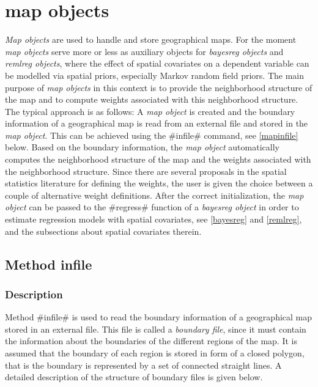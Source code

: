 \chapter{map objects}
\label{map} 

{\em Map objects} are used to handle and store geographical maps.
For the moment {\em map objects} serve more or less as auxiliary
objects for {\em bayesreg objects} and {\em remlreg objects}, where
the effect of spatial covariates on a dependent variable can be
modelled via spatial priors, especially Markov random field priors.
The main purpose of {\em map objects} in this context is to provide
the neighborhood structure of the map and to compute weights
associated with this neighborhood structure. The typical approach is
as follows: A {\em map object} is created and the boundary
information of a geographical map is read from an external file and
stored in the {\em map object}. This can be achieved using the
#infile# command, see \autoref{mapinfile} below. Based on the
boundary information, the {\em map object} automatically computes
the neighborhood structure of the map and the weights associated
with the neighborhood structure. Since there are several proposals
in the spatial statistics literature for defining the weights, the
user is given the choice between a couple of alternative weight
definitions. After the correct initialization, the {\em map object}
can be passed to the #regress# function of a {\em bayesreg object}
in order to estimate regression models with spatial covariates, see
\autoref{bayesreg} and \autoref{remlreg}, and the subsections about
spatial covariates therein.

\clearpage



\section{Method infile}
\label{mapinfile}    
 

\subsection{Description}


Method #infile# is used to read the boundary information of a
geographical map stored in an external file. This file is called a
{\em boundary file}, since it must contain the information about
the boundaries of the different regions of the map. It is assumed
that the boundary of each region is stored in form of a closed
polygon, that is the boundary is represented by a set of connected
straight lines. A detailed description of the structure of
boundary files is given below.

